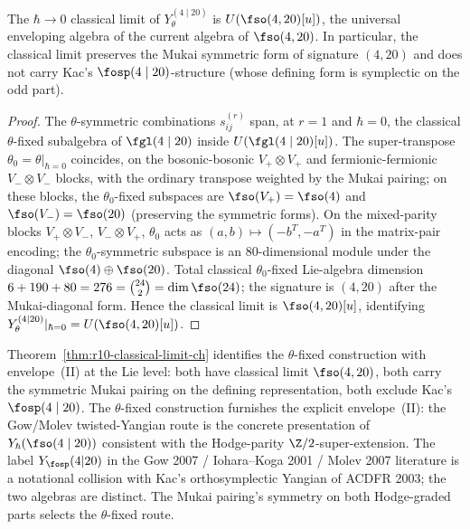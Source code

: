\begin{theorem}
\label{thm:r10-classical-limit-ch}
The $\hbar \to 0$ classical limit of $Y_\theta^{(4 \mid 20)}$ is
$U(\fso(4, 20)[u])$, the universal enveloping algebra of the
current algebra of $\fso(4, 20)$. In particular, the classical limit
preserves the Mukai symmetric form of signature $(4, 20)$ and does
not carry Kac's $\fosp(4 \mid 20)$-structure (whose defining form is
symplectic on the odd part).
\end{theorem}

\begin{proof}
The $\theta$-symmetric combinations $s^{(r)}_{ij}$ span, at $r = 1$
and $\hbar = 0$, the classical $\theta$-fixed subalgebra of
$\fgl(4 \mid 20)$ inside $U(\fgl(4 \mid 20)[u])$. The super-transpose
$\theta_0 = \theta|_{\hbar = 0}$ coincides, on the bosonic-bosonic
$V_+ \otimes V_+$ and fermionic-fermionic $V_- \otimes V_-$ blocks,
with the ordinary transpose weighted by the Mukai pairing; on these
blocks, the $\theta_0$-fixed subspaces are $\fso(V_+) = \fso(4)$ and
$\fso(V_-) = \fso(20)$ (preserving the symmetric forms). On the
mixed-parity blocks $V_+ \otimes V_-$, $V_- \otimes V_+$, $\theta_0$
acts as $(a, b) \mapsto (-b^T, -a^T)$ in the matrix-pair encoding;
the $\theta_0$-symmetric subspace is an $80$-dimensional module under
the diagonal $\fso(4) \oplus \fso(20)$. Total classical $\theta_0$-fixed
Lie-algebra dimension $6 + 190 + 80 = 276 = \binom{24}{2} =
\dim \fso(24)$; the signature is $(4, 20)$ after the Mukai-diagonal
form. Hence the classical limit is $\fso(4, 20)[u]$, identifying
$Y_\theta^{(4 \mid 20)}|_{\hbar = 0} = U(\fso(4, 20)[u])$.
\end{proof}

\begin{remark}
\label{rem:r10-Y-theta-is-envelope-II-ch}
Theorem~\ref{thm:r10-classical-limit-ch} identifies the $\theta$-fixed
construction with envelope~(II) at the Lie level: both have classical
limit $\fso(4, 20)$, both carry the symmetric Mukai pairing on the
defining representation, both exclude Kac's $\fosp(4 \mid 20)$. The
$\theta$-fixed construction furnishes the explicit envelope~(II):
the Gow/Molev twisted-Yangian route is the concrete presentation of
$Y_\hbar(\fso(4 \mid 20))$ consistent with the Hodge-parity
$\Z/2$-super-extension. The label $Y_{\fosp}(4|20)$ in the Gow 2007
/ Iohara--Koga 2001 / Molev 2007 literature is a notational collision
with Kac's orthosymplectic Yangian of ACDFR 2003; the two algebras
are distinct. The Mukai pairing's symmetry on both Hodge-graded parts
selects the $\theta$-fixed route.
\end{remark}

